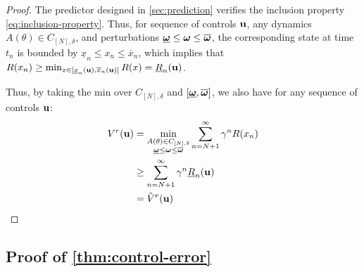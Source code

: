 \documentclass{article}
\begin{document}
\begin{proof}
	The predictor designed in \autoref{sec:prediction} verifies the inclusion property \eqref{eq:inclusion-property}. Thus, for sequence of controls $\mathbf{u}$, any dynamics $A(\theta)\in C_{[N],\delta}$, and perturbations $\underline{\bm{\omega}} \leq \bm{\omega} \leq \overline{\bm{\omega}}$, the corresponding state at time $t_n$ is bounded by $\underline{x}_n \leq x_n \leq \overline{x}_n$, which implies that $R(x_n) \geq \min_{x\in[\underline{x}_n(\mathbf{u}), \overline{x}_n(\mathbf{u})]}  R(x) = \underline{R}_n(\mathbf{u})$.
	
	Thus, by taking the min over $C_{[N],\delta}$ and $[\underline{\bm{\omega}}, \overline{\bm{\omega}}]$, we also have for any sequence of controls $\mathbf{u}$:
	\begin{align*}
	    V^r(\mathbf{u}) &= \min_{\substack{A(\theta)\in C_{[N],\delta}\\ \underline{\bm{\omega}} \leq \bm{\omega} \leq \overline{\bm{\omega}}}} \sum_{n=N+1}^\infty \gamma^n R(x_n)\\
	    &\geq \sum_{n=N+1}^\infty \gamma^n \underline{R}_n(\mathbf{u})\\
	    &= \hat{V}^r(\mathbf{u})
	\end{align*}
\end{proof}

\subsection{Proof of \autoref{thm:control-error}}
\end{document}
